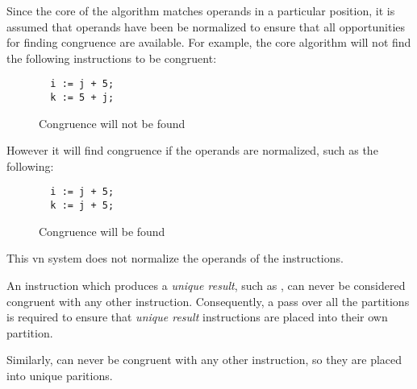 Since the core of the algorithm matches operands in a particular
position, it is assumed that operands have been be normalized to
ensure that all opportunities for finding congruence are available.
For example, the core algorithm will not find the following
instructions to be congruent:

\begin{figure}
\begin{verbatim}
  i := j + 5;
  k := 5 + j;
\end{verbatim}
\caption{Congruence will not be found}
\end{figure}

However it will find congruence if the operands are normalized, such
as the following:

\begin{figure}
\begin{verbatim}
  i := j + 5;
  k := j + 5;
\end{verbatim}
\caption{Congruence will be found}
\end{figure}

This \ac{vn} system does not normalize the operands of the
instructions.

An instruction which produces a \emph{unique result}, such as
, can never be considered congruent with any other
instruction.  Consequently, a pass over all the partitions is required
to ensure that \emph{unique result} instructions are placed into their
own partition.

Similarly,  can never be congruent with any other
instruction, so they are placed into unique paritions.
